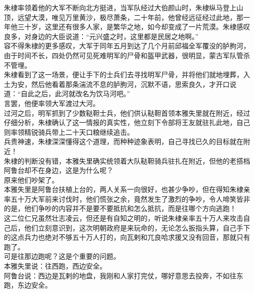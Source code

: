 \begin{multicols}{\theparacolNo}
朱棣率领着他的大军不断向北方挺进，当军队经过大伯颜山时，朱棣纵马登上山顶，远望大漠，唯见万里黄沙，极尽萧条，二十年前，他曾经远征经过此地，那一年他三十岁，这里还有很多人家，是繁华之地，如今却变成了一片荒漠。朱棣感叹良多，对身边的大臣说道：“元兴盛之时，这里都是民居之地啊。”\\

容不得朱棣的更多感叹，大军于同年五月到达了几个月前邱福全军覆没的胪朐河，由于时间不长，四处仍然可见死难明军的尸骨和盔甲武器，很明显，蒙古军队管杀不管埋。\\

朱棣看到了这一场景，便让手下的士兵们去寻找明军尸骨，并将他们就地埋葬，入土为安，然后他看着那条湍流不息的胪朐河，沉默不语，思索良久，才开口说道：“自此之后，此河就改名为饮马河吧。”\\

言罢，他便率领大军渡过大河。\\

过河之后，明军抓到了少数鞑靼士兵，他们供认鞑靼首领本雅失里就在附近，经过仔细分析，朱棣确认了这一情报的真实性，他立刻下令部将王友就驻扎此地，自己则率领精锐骑兵带上二十天口粮继续追击。\\

兵贵神速，朱棣深深懂得这个道理，而种种迹象表明，自己寻找已久的目标就在附近！\\

朱棣的判断没有错，本雅失里确实统领着大队鞑靼骑兵驻扎在附近，但他的老搭档阿鲁台却不在身边，这是为什么呢？\\

原来他们吵架了。\\

本雅失里是阿鲁台扶植上台的，两人关系一向很好，也甚少争吵，但在得知朱棣亲率五十万大军前来讨伐时，他们慌张之余，竟然发生了激烈的争吵，令人啼笑皆非的是，他们争吵的内容并不是要不要抵抗和怎么抵抗，而是往哪个方向逃跑！\\

这二位仁兄虽然壮志凌云，但还是有自知之明的，听说朱棣亲率五十万人来攻击自己后，他们立刻意识到，这次明朝政府是来玩命的，无论怎么扳指头算，自己手下的这点兵力也绝对不够五十万人打的，向瓦剌和兀良哈求援又没有回音，那就只有跑了。\\

可是往那边跑呢？这是个重要的问题。\\

本雅失里说：往西跑，西边安全。\\

阿鲁台说：西边是瓦剌的地盘，我刚和人家打完仗，哪好意思去投奔，不如往东跑，东边安全。\\


\end{multicols}
